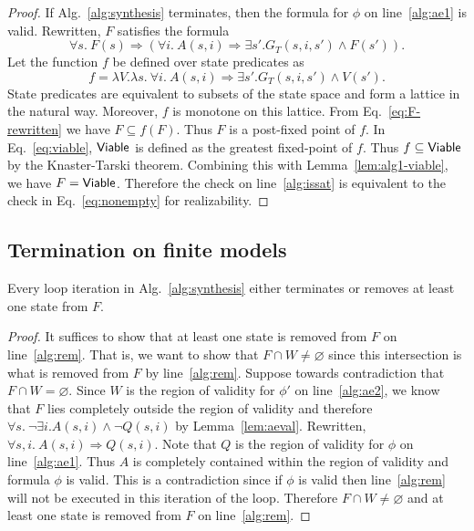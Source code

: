 \begin{proof}
If Alg.~\ref{alg:synthesis} terminates, then the
formula for $\phi$ on line~\ref{alg:ae1} is valid. Rewritten, $F$
satisfies the formula
\begin{equation}
  \forall s.~F(s) \Rightarrow \left(\forall i.~ A(s,i) \Rightarrow \exists
    s'.G_{T}(s,i,s') \land F(s')\right).
  \label{eq:F-rewritten}
\end{equation}
Let the function $f$ be defined over state predicates as
  \begin{equation}
    f = \lambda V. \lambda s.~ \forall i.~ A(s,i) \Rightarrow \exists s'.G_{T}(s,i,s') \land V(s').
    \label{eq:f-fixed-point}
  \end{equation}
  State predicates are equivalent to subsets of the state space and
  form a lattice in the natural way. Moreover, $f$ is monotone on this
  lattice. From Eq.~\ref{eq:F-rewritten} we have
  $F \subseteq f(F)$. Thus $F$ is a post-fixed point of $f$. In
  Eq.~\ref{eq:viable}, ${\mathsf {Viable}}$ is defined as the greatest
  fixed-point of $f$. Thus $f \subseteq {\mathsf {Viable}}$ by the Knaster-Tarski
  theorem. Combining this with Lemma~\ref{lem:alg1-viable}, we have
  $F = {\mathsf {Viable}}$. Therefore the check on line~\ref{alg:issat} is equivalent to the
  check in Eq.~\ref{eq:nonempty} for realizability.
\end{proof}

\subsection{Termination on finite models}
\label{sec:termfinal}
\begin{lemma}
Every loop iteration in Alg.~\ref{alg:synthesis} either
terminates or removes at least one state from $F$.
\label{lem:progress}
\end{lemma}
\begin{proof}
  It suffices to show that at least one state is removed from $F$ on
  line~\ref{alg:rem}. That is, we want to show that $F \cap W \neq \varnothing$ since
  this intersection is what is removed from $F$ by line~\ref{alg:rem}. Suppose
  towards contradiction that $F \cap W = \varnothing$. Since $W$ is the
  region of validity for $\phi'$ on line~\ref{alg:ae2}, we know that $F$ lies
  completely outside the region of validity and therefore
  $\forall s.~ \neg \exists i. A(s,i) \land \neg Q(s, i)$
  by Lemma~\ref{lem:aeval}. Rewritten,
  $\forall s, i.~ A(s, i) \Rightarrow Q(s, i)$. Note that $Q$ is the
  region of validity for $\phi$ on line~\ref{alg:ae1}. Thus $A$ is completely
  contained within the region of validity and formula $\phi$ is valid.
  This is a contradiction since if $\phi$ is valid then line~\ref{alg:rem} will
  not be executed in this iteration of the loop. Therefore
  $F \cap W \neq \varnothing$ and at least one state is removed from $F$
  on line~\ref{alg:rem}.
\end{proof}

